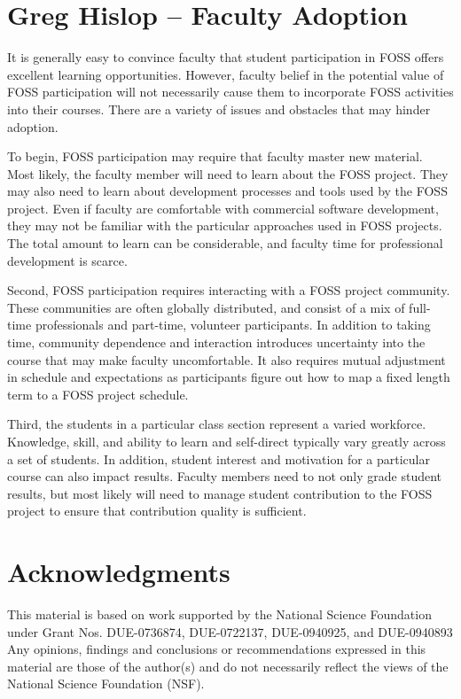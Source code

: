 \documentclass{sig-alt-release2}
\begin{document}
\section{Greg Hislop -- Faculty Adoption}        
It is generally easy to convince faculty that student participation in FOSS offers excellent learning opportunities.  However, faculty belief in the potential value of FOSS participation will not necessarily cause them to incorporate FOSS activities into their courses.  There are a variety of issues and obstacles that may hinder adoption.

To begin, FOSS participation may require that faculty master new material.  Most likely, the faculty member will need to learn about the FOSS project.  They may also need to learn about development processes and tools used by the FOSS project.  Even if faculty are comfortable with commercial software development, they may not be familiar with the particular approaches used in FOSS projects.  The total amount to learn can be considerable, and faculty time for professional development is scarce.

Second, FOSS participation requires interacting with a FOSS project community.  These communities are often globally distributed, and consist of a mix of full-time professionals and part-time, volunteer participants.  In addition to taking time, community dependence and interaction introduces uncertainty into the course that may make faculty uncomfortable.  It also requires mutual adjustment in schedule and expectations as participants figure out how to map a fixed length term to a FOSS project schedule.

Third, the students in a particular class section represent a varied workforce.  Knowledge, skill, and ability to learn and self-direct typically vary greatly across a set of students. In addition, student interest and motivation for a particular course can also impact results.  Faculty members need to not only grade student results, but most likely will need to manage student contribution to the FOSS project to ensure that contribution quality is sufficient.

\section{Acknowledgments}
This material is based on work supported by the National Science Foundation under Grant Nos. DUE-0736874, DUE-0722137, DUE-0940925, and DUE-0940893 Any opinions, findings and conclusions or recommendations expressed in this material are those of the author(s) and do not necessarily reflect the views of the National Science Foundation (NSF).
\end{document}
